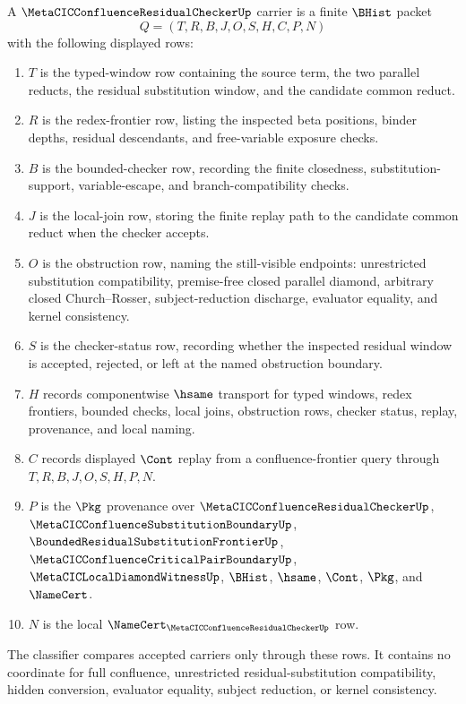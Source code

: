 \begin{definition}
\label{def:metacic-confluence-residual-checker-carrier}
A $\MetaCICConfluenceResidualCheckerUp$ carrier is a finite $\BHist$ packet
$$
Q=(T,R,B,J,O,S,H,C,P,N)
$$
with the following displayed rows:
\begin{enumerate}
\item $T$ is the typed-window row containing the source term, the two parallel reducts, the residual substitution window, and the candidate common reduct.
\item $R$ is the redex-frontier row, listing the inspected beta positions, binder depths, residual descendants, and free-variable exposure checks.
\item $B$ is the bounded-checker row, recording the finite closedness, substitution-support, variable-escape, and branch-compatibility checks.
\item $J$ is the local-join row, storing the finite replay path to the candidate common reduct when the checker accepts.
\item $O$ is the obstruction row, naming the still-visible endpoints: unrestricted substitution compatibility, premise-free closed parallel diamond, arbitrary closed Church--Rosser, subject-reduction discharge, evaluator equality, and kernel consistency.
\item $S$ is the checker-status row, recording whether the inspected residual window is accepted, rejected, or left at the named obstruction boundary.
\item $H$ records componentwise $\hsame$ transport for typed windows, redex frontiers, bounded checks, local joins, obstruction rows, checker status, replay, provenance, and local naming.
\item $C$ records displayed $\Cont$ replay from a confluence-frontier query through $T,R,B,J,O,S,H,P,N$.
\item $P$ is the $\Pkg$ provenance over $\MetaCICConfluenceResidualCheckerUp$, $\MetaCICConfluenceSubstitutionBoundaryUp$, $\BoundedResidualSubstitutionFrontierUp$, $\MetaCICConfluenceCriticalPairBoundaryUp$, $\MetaCICLocalDiamondWitnessUp$, $\BHist$, $\hsame$, $\Cont$, $\Pkg$, and $\NameCert$.
\item $N$ is the local $\NameCert_{\MetaCICConfluenceResidualCheckerUp}$ row.
\end{enumerate}
The classifier compares accepted carriers only through these rows. It contains no coordinate for full confluence, unrestricted residual-substitution compatibility, hidden conversion, evaluator equality, subject reduction, or kernel consistency.
\end{definition}


